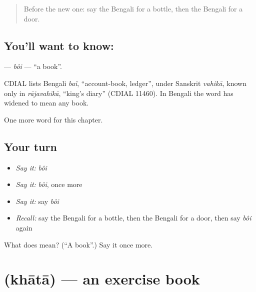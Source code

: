 \label{lesson:BN-C63-boi}



\begin{quote}
Before the new one: say the Bengali for a bottle, then the Bengali for a door.
\end{quote}

\subsection*{You'll want to know: }
\textbf{} — \emph{bôi} — \textquotedblleft{}a book\textquotedblright{}.

\begin{cousinweb}
CDIAL lists Bengali \emph{baï}, \textquotedblleft{}account-book, ledger\textquotedblright{}, under Sanskrit \emph{vahikā}, known only in \emph{rājavahikā}, \textquotedblleft{}king's diary\textquotedblright{} (CDIAL 11460). In Bengali the word has widened to mean any book.
\end{cousinweb}

\begin{grammarlens}[title={What you've built}]
One more word for this chapter.
\end{grammarlens}

\subsection*{Your turn}
\begin{itemize}
\raggedright
  \item \emph{Say it:} \emph{bôi}
  \item \emph{Say it:} \emph{bôi}, once more
  \item \emph{Say it:} say \emph{bôi}
  \item \emph{Recall:} say the Bengali for a bottle, then the Bengali for a door, then say \emph{bôi} again
\end{itemize}

\begin{tcolorbox}[breakable,colback=teal!4,colframe=teal!35!black,title={Before you move on}]
What does  mean? (\textquotedblleft{}A book\textquotedblright{}.) Say it once more.
\end{tcolorbox}
\section[\texorpdfstring{\bn{খাতা} (khātā)}{খাতা (khātā)}]{ (khātā) — an exercise book}

